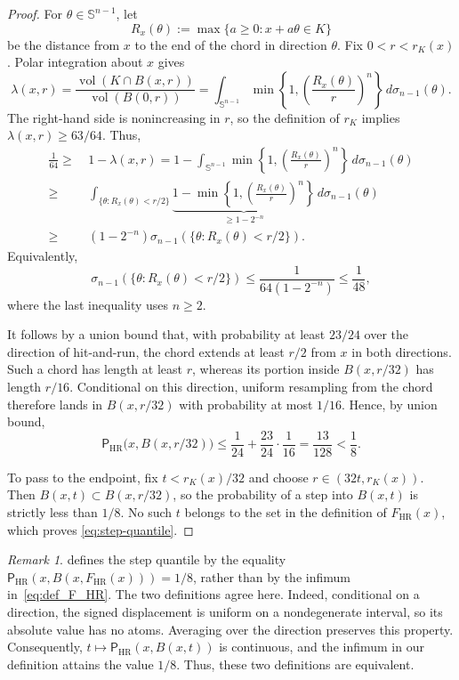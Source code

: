 \documentclass[11pt]{article}
\theoremstyle{definition}
\theoremstyle{remark}
\newtheorem{remark}[theorem]{Remark}
\newcommand{\vol}{\operatorname{vol}}
\newcommand{\HRzero}{\mathsf P_{\mathrm{HR}}}
\newcommand{\rK}{r_K}
\begin{document}
\begin{proof}
For $\theta\in\mathbb S^{n-1}$, let
\[
 R_x(\theta):=\max\{a\ge0:x+a\theta\in K\}
\]
be the distance from $x$ to the end of the chord in direction $\theta$.
Fix $0<r<\rK(x)$.  Polar integration about $x$ gives
\begin{equation}\label{eq:polar-occupancy}
 \lambda(x,r)=\frac{\vol(K\cap B(x,r))}{\vol(B(0,r))}
 =
 \int_{\mathbb S^{n-1}}
 \min\left\{
 1,\left(\frac{R_x(\theta)}r\right)^n
 \right\}
 \,d\sigma_{n-1}(\theta).
\end{equation}
The right-hand side is nonincreasing in $r$, so the definition of $\rK$
implies $\lambda(x,r)\ge63/64$. Thus,
\begin{align*}
    \frac{1}{64}\geq &~ 1-\lambda(x,r)=1-\int_{\mathbb S^{n-1}}\min\left\{1,\left(\frac{R_x(\theta)}r\right)^n\right\}\,d\sigma_{n-1}(\theta)\\
    \geq &~ \int_{\{\theta:R_x(\theta)<r/2\}} \underbrace{1- \min\left\{1,\left(\frac{R_x(\theta)}r\right)^n\right\}}_{\geq 1-2^{-n}}\,d\sigma_{n-1}(\theta)\\
    \geq &~ \left(1-2^{-n}\right)\sigma_{n-1}\left(\{\theta:R_x(\theta)<r/2\}\right).
\end{align*}
Equivalently,
\[
 \sigma_{n-1}(\{\theta:R_x(\theta)<r/2\})
 \le
 \frac{1}{64(1-2^{-n})}
 \le\frac1{48},
\]
where the last inequality uses $n\ge2$.

It follows by a union bound that, with probability at least $23/24$ over
the direction of hit-and-run, the chord extends at least $r/2$ from $x$ in
both directions.  Such a chord has length at least $r$, whereas its portion
inside $B(x,r/32)$ has length $r/16$.  Conditional on this direction,
uniform resampling from the chord therefore lands in $B(x,r/32)$ with
probability at most $1/16$.  Hence, by union bound,
\[
 \HRzero\bigl(x,B(x,r/32)\bigr)
 \le
 \frac1{24}+\frac{23}{24}\cdot\frac1{16}
 =
 \frac{13}{128}
 <
 \frac18.
\]

To pass to the endpoint, fix $t<\rK(x)/32$ and choose
$r\in(32t,\rK(x))$.  Then
$B(x,t)\subset B(x,r/32)$, so the probability of a step into $B(x,t)$ is
strictly less than $1/8$.  No such $t$ belongs to the set in the definition
of $F_{\mathrm{HR}}(x)$, which proves \eqref{eq:step-quantile}.  
\end{proof}

\begin{remark}
\cite{LovaszHR} defines the step quantile by the equality
\(
 \HRzero(x,B(x,F_{\mathrm{HR}}(x)))=1/8
\), rather than by the infimum in~\eqref{eq:def_F_HR}.  The two definitions agree here.  Indeed, conditional on a direction, the signed displacement is uniform on a nondegenerate interval, so its absolute value has no atoms.  Averaging over the direction preserves this property.  Consequently,
\(t\mapsto\HRzero(x,B(x,t))\) is continuous, and the infimum in our definition attains the value $1/8$.  Thus, these two definitions are equivalent.
\end{remark}
\end{document}
